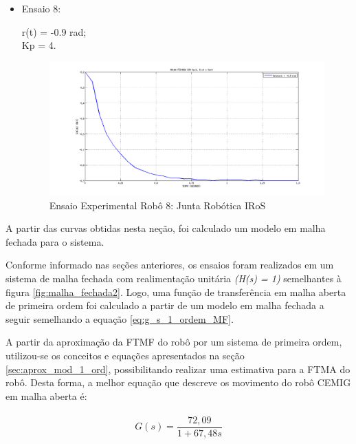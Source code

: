 \documentclass[12pt,oneside,a4paper, chapter=TITLE, section = TITLE, english, brazil]{abntex2}
\begin{document}
\begin{itemize}
\item Ensaio 8:


r(t) = -0.9 rad;\\
Kp = 4.\\


\begin{figure}[h] %
\centering
\includegraphics[scale=0.42]{./imagens/Ensaio4_2_robo}
\caption[Ensaio Experimental Robô 8: Junta Robótica IRoS]{Ensaio Experimental Robô 8: Junta Robótica IRoS}
\label{fig:ensaio4_2_robo}
\end{figure}

\end{itemize}

A partir das curvas obtidas nesta neção, foi calculado um modelo em malha fechada para o sistema.

Conforme informado nas seções anteriores, os ensaios foram realizados em um sistema de malha fechada com realimentação unitária \textit{(H(s) = 1)} semelhantes à figura \ref{fig:malha_fechada2}. Logo, uma função de transferência em malha aberta de primeira ordem foi calculado a partir de um modelo em malha fechada a seguir semelhando a equação \ref{eq:g_s_1_ordem_MF}.

A partir da aproximação da FTMF do robô por um sistema de primeira ordem, utilizou-se os conceitos e equações apresentados na seção \ref{sec:aprox_mod_1_ord}, possibilitando realizar uma estimativa para a FTMA do robô. Desta forma, a melhor equação que descreve os movimento do robô CEMIG em malha aberta é:
\\
\\
$$G(s) = \frac{72,09}{1 + 67,48 s}$$
\\
\\
\\
\end{document}
